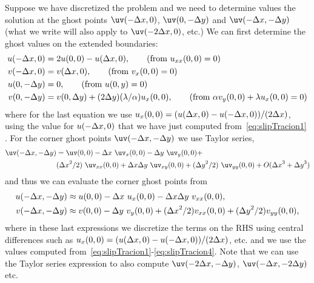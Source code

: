 \documentclass[11pt]{article}
\begin{document}
Suppose we have discretized the problem and we need to determine values the solution at the
ghost points $\uv(-\dx,0)$, $\uv(0,-\dy)$ and $\uv(-\dx,-\dy)$ (what we write will also apply to $\uv(-2\dx,0)$, etc.)
We can first determine the ghost values on the extended boundaries:
\begin{align}
  u(-{\Delta x},0) & = 2u(0,0)-u({\Delta x},0) ,  \qquad \text{(from $u_{xx}(0,0) =0$)} \label{eq:slipTracion1} \\
  v(-{\Delta x},0) & = v({\Delta x},0) ,  \qquad \text{(from $v_{x}(0,0) =0$)} \\
  u(0,-{\Delta y}) & = 0 , \qquad \text{(from $u(0,y) = 0$)} \\
  v(0,-{\Delta y}) &= v(0,{\Delta y}) + (2{\Delta y}) (\lambda/\alpha) u_x(0,0)  ,  \qquad \text{(from $\alpha v_y(0,0)+\lambda u_x(0,0)=0$)}
              \label{eq:slipTracion4}
\end{align}
where for the last equation we use $u_x(0,0)=(u({\Delta x},0)-u(-{\Delta x},0))/(2{\Delta x})$, using the value for $u(-{\Delta x},0)$ that
we have just computed from~\eqref{eq:slipTracion1} . 
For the corner ghost points $\uv(-\dx,-\dy)$ we use Taylor series, 
\begin{align}
  \uv(-\dx,-\dy) & = \uv(0,0) -\dx~\uv_x(0,0) -\dy~ \uv_y(0,0) + \\
               & (\dx^2/2)~ \uv_{xx}(0,0) + \dx\dy~ \uv_{xy}(0,0) + (\dy^2/2)~ \uv_{yy}(0,0) + O(\dx^3+\dy^3) 
\end{align}
and thus we can evaluate the corner ghost points from 
\begin{align}
  u(-{\Delta x},-{\Delta y}) & \approx u(0,0) -{\Delta x}~ u_x(0,0) - {\Delta x}{\Delta y}~ v_{xx}(0,0),   \\
  v(-{\Delta x},-{\Delta y}) & \approx v(0,0) -{\Delta y}~ v_y(0,0) + ({\Delta x}^2/2) v_{xx}(0,0) + ({\Delta y}^2/2) v_{yy}(0,0),
\end{align}
where in these last expressions we discretize the terms on the RHS using central differences such
as $u_x(0,0)=(u({\Delta x},0)-u(-{\Delta x},0))/(2{\Delta x})$, etc. and we use the values computed from~\eqref{eq:slipTracion1}-\eqref{eq:slipTracion4}.
Note that we can use the Taylor series expression to also compute $\uv(-2\dx,-\dy)$, $\uv(-\dx,-2\dy)$ etc. 
\end{document}
